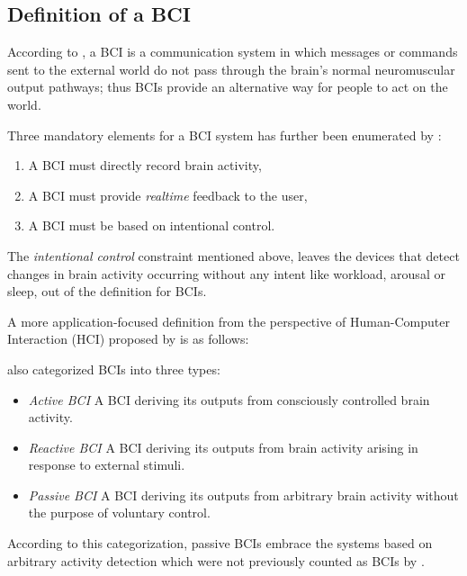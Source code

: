 \documentclass[12pt]{article}
\newcommand\mysubsection[1]{\subsection{#1}}
\numberwithin{equation}{section}
\numberwithin{figure}{section}
\numberwithin{table}{section}
\begin{document}
\mysubsection{Definition of a BCI}\label{seq:bci_definition}
\par{
    According to \citet{wolpaw_braincomputer_2002}, a BCI is a communication system
    in which messages or commands sent to the external world do not pass through the
    brain's normal neuromuscular output pathways; thus BCIs provide an alternative
    way for people to act on the world.
}
\par{
    Three mandatory elements for a BCI system has further been enumerated by \citet{graimann_braincomputer_2010}:
    \begin{enumerate}
        \item A BCI must directly record brain activity,
        \item A BCI must provide \emph{realtime} feedback to the user,
        \item A BCI must be based on intentional control.
    \end{enumerate}
    The \emph{intentional control} constraint mentioned above, leaves the devices
    that detect changes in brain activity occurring without any intent like
    workload, arousal or sleep, out of the definition for BCIs.
}
\par{
    A more application-focused definition from the perspective of
    Human-Computer Interaction (HCI) proposed by \citet{zander_enhancing_2010}
    is as follows:
}
\par{
    \citet{zander_enhancing_2008} also categorized BCIs into three types:
    \begin{itemize}
        \item \emph{Active BCI} A BCI deriving its outputs from consciously controlled brain activity.
        \item \emph{Reactive BCI} A BCI deriving its outputs from brain activity arising in response to external stimuli.
        \item \emph{Passive BCI} A BCI deriving its outputs from arbitrary brain activity without the purpose of voluntary control.
    \end{itemize}
    According to this categorization, passive BCIs embrace the systems
    based on arbitrary activity detection which were not previously counted as BCIs by \citet{graimann_braincomputer_2010}.
}
\end{document}
